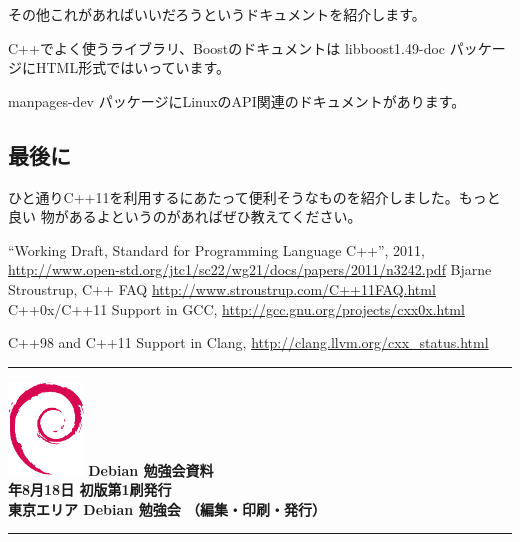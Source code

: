 \documentclass[mingoth,a4paper]{jsarticle}
\newcommand{\debmtgyear}{2012}
\newcommand{\debmtgmonth}{8}
\newcommand{\debmtgdate}{18}
\begin{document}
その他これがあればいいだろうというドキュメントを紹介します。

C++でよく使うライブラリ、Boostのドキュメントは libboost1.49-doc パッケージにHTML形式ではいっています。

manpages-dev パッケージにLinuxのAPI関連のドキュメントがあります。

\subsection{最後に}

ひと通りC++11を利用するにあたって便利そうなものを紹介しました。もっと良い
物があるよというのがあればぜひ教えてください。

\begin{thebibliography}{98}
 ``Working Draft, Standard for Programming Language
	C++'', 2011,
	\url{http://www.open-std.org/jtc1/sc22/wg21/docs/papers/2011/n3242.pdf}
	Bjarne Stroustrup, C++ FAQ
	\url{http://www.stroustrup.com/C++11FAQ.html}
	C++0x/C++11 Support in GCC, 
	\url{http://gcc.gnu.org/projects/cxx0x.html}

	C++98 and C++11 Support in Clang, \url{http://clang.llvm.org/cxx_status.html}
\end{thebibliography}


\cleartooddpage

\vspace*{15cm}
\hrule
\vspace{2mm}
\includegraphics[width=2cm]{image200502/openlogo-nd.eps}
\noindent \Large \bf Debian 勉強会資料\\
\noindent \normalfont \debmtgyear{}年\debmtgmonth{}月\debmtgdate{}日 \hspace{5mm}  初版第1刷発行\\
\noindent \normalfont 東京エリア Debian 勉強会 （編集・印刷・発行）\\
\hrule
\end{document}
